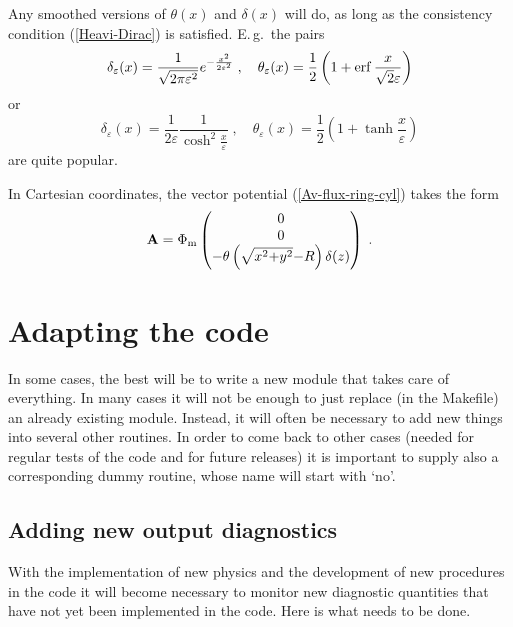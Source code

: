 \documentclass[12pt,twoside,notitlepage,a4paper]{article}
\newcommand{\erf}     {\mathop{\rm erf}\nolimits}
\newcommand{\vekt}[1] {\mathbf{#1}}
\newcommand{\Av}            {\vekt{A}}
\newcommand{\Heavi}         {\theta}
\begin{document}
Any smoothed versions of $\Heavi(x)$ and $\delta(x)$ will do, as long as
the consistency condition (\ref{Heavi-Dirac}) is satisfied.
E.\,g.~the pairs
\begin{equation}
  \delta_\varepsilon(x)
  = \frac{1}{\sqrt{2\pi\varepsilon^2}} e^{-\frac{x^2}{2\varepsilon^2}} \; ,
  \quad
  \Heavi_\varepsilon(x)
  = \frac{1}{2} \left( 1 + \erf\frac{x}{\sqrt{2}\varepsilon} \right)
\end{equation}
or
\begin{equation}
  \delta_\varepsilon(x)
  = \frac{1}{2\varepsilon}\frac{1}{\cosh^2\frac{x}{\varepsilon}} \; ,
  \quad
  \Heavi_\varepsilon(x)
  = \frac{1}{2} \left( 1 + \tanh\frac{x}{\varepsilon} \right)
\end{equation}
are quite popular.

In Cartesian coordinates, the vector potential (\ref{Av-flux-ring-cyl})
takes the form
\begin{equation} \label{Av-flux-ring-cart}
  \Av =
  \Phi_{\rm m}
  \begin{pmatrix}
    0\\ 0\\ -\Heavi \left( \sqrt{x^2{+}y^2}{-}R \right) \delta(z)
  \end{pmatrix} \; .
\end{equation}



\section{Adapting the code}

In some cases, the best will be
to write a new module that takes care of everything.
In many cases it will not be enough to just replace (in the Makefile)
an already existing module. Instead, it will often be necessary to
add new things into several other routines. In order to come back
to other cases (needed for regular tests of the code and for future
releases) it is important to supply also a corresponding dummy routine,
whose name will start with `no'.


\subsection{Adding new output diagnostics}

With the implementation of new physics and the development of new procedures
in the code it will become necessary to monitor new diagnostic quantities that
have not yet been implemented in the code. Here is what needs to be done.
\end{document}
